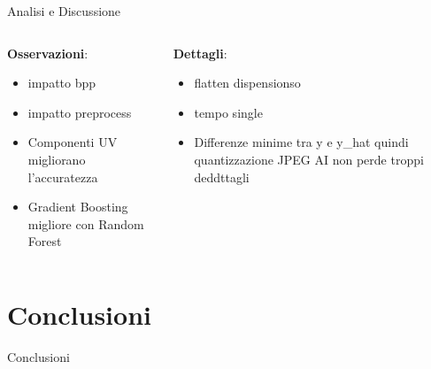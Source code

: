 \documentclass[11pt]{beamer}
\begin{document}
\begin{frame}{Analisi e Discussione}
\begin{columns}[t]
    \begin{column}{0.5\linewidth}
    \textbf{Osservazioni}:
    \begin{itemize}
        \item impatto bpp
        \item impatto preprocess
        \item Componenti UV migliorano l'accuratezza
        \item Gradient Boosting migliore con Random Forest
    \end{itemize}    
    \end{column}
    \hfill
    \begin{column}{0.5\linewidth}
    \textbf{Dettagli}:
    \begin{itemize}
        \item flatten dispensionso
        \item tempo single
        \item Differenze minime tra y e y\_hat quindi quantizzazione JPEG AI non perde troppi deddttagli
    \end{itemize}
\end{column}   
\end{columns}
\end{frame}

\section{Conclusioni}
\begin{frame}{Conclusioni}
\end{frame}


\backmatter
\end{document}
